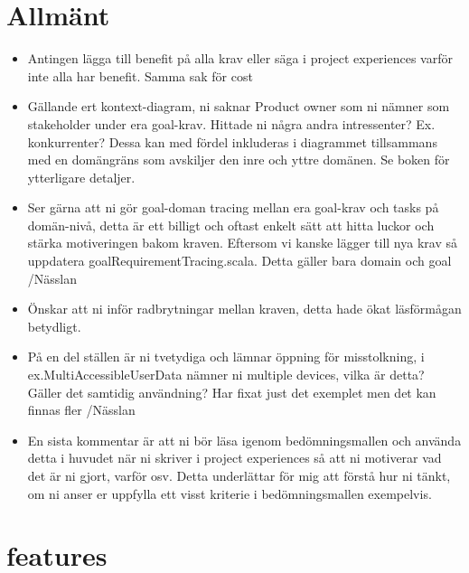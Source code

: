 \documentclass[a4paper]{article}
\begin{document}
	\thispagestyle{empty}
	\setcounter{page}{0}
	\pagebreak
	\tableofcontents
	\pagebreak

\section{Allmänt}
\begin{itemize}

	\item Antingen lägga till benefit på alla krav eller säga i project experiences varför inte alla har benefit. Samma sak för cost
	
	\item Gällande ert kontext-diagram, ni saknar Product owner som ni nämner som stakeholder under era goal-krav. Hittade ni några andra intressenter? Ex. konkurrenter? Dessa kan med fördel inkluderas i diagrammet tillsammans med en domängräns som avskiljer den inre och yttre domänen. Se boken för ytterligare detaljer.
	
	\item Ser gärna att ni gör goal-doman tracing mellan era goal-krav och tasks på domän-nivå, detta är ett billigt och oftast enkelt sätt att hitta luckor och stärka motiveringen bakom kraven. Eftersom vi kanske lägger till nya krav så uppdatera goalRequirementTracing.scala. Detta gäller bara domain och goal /Nässlan
	
	\item Önskar att ni inför radbrytningar mellan kraven, detta hade ökat läsförmågan betydligt.
	

	\item På en del ställen är ni tvetydiga och lämnar öppning för misstolkning, i ex.MultiAccessibleUserData nämner ni multiple devices, vilka är detta? Gäller det samtidig användning? Har fixat just det exemplet men det kan finnas fler /Nässlan
	
	
	\item En sista kommentar är att ni bör läsa igenom bedömningsmallen och använda detta i huvudet när ni skriver i project experiences så att ni motiverar vad det är ni gjort, varför osv. Detta underlättar för mig att förstå hur ni tänkt, om ni anser er uppfylla ett visst kriterie i bedömningsmallen exempelvis.
	
	
	
	
\end{itemize}


\section{features}
\end{document}
